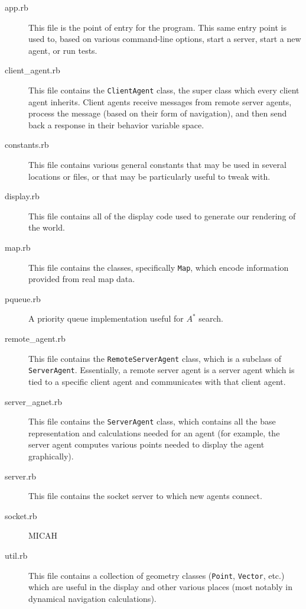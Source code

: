 \documentclass{article}
\newcommand{\code}{\texttt}
\begin{document}
\begin{description}
\item[app.rb] This file is the point of entry for the program. This same entry
  point is used to, based on various command-line options, start a server, start
  a new agent, or run tests.

\item[client\_agent.rb] This file contains the \code{ClientAgent} class, the
  super class which every client agent inherits. Client agents receive messages
  from remote server agents, process the message (based on their form of
  navigation), and then send back a response in their behavior variable space.

\item[constants.rb] This file contains various general constants that may be
  used in several locations or files, or that may be particularly useful to
  tweak with.

\item[display.rb] This file contains all of the display code used to generate
  our rendering of the world.

\item[map.rb] This file contains the classes, specifically \code{Map}, which
  encode information provided from real map data.

\item[pqueue.rb] A priority queue implementation useful for $A^*$ search.

\item[remote\_agent.rb] This file contains the \code{RemoteServerAgent} class,
  which is a subclass of \code{ServerAgent}. Essentially, a remote server agent
  is a server agent which is tied to a specific client agent and communicates
  with that client agent.

\item[server\_agnet.rb] This file contains the \code{ServerAgent} class, which
  contains all the base representation and calculations needed for an agent (for
  example, the server agent computes various points needed to display the agent
  graphically).

\item[server.rb] This file contains the socket server to which new agents
  connect.

\item[socket.rb] MICAH

\item[util.rb] This file contains a collection of geometry classes
  (\code{Point}, \code{Vector}, etc.) which are useful in the display and other
  various places (most notably in dynamical navigation calculations).


\end{description}
\end{document}
